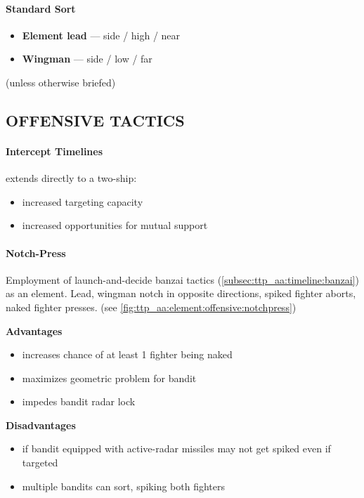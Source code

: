 \paragraph{Standard Sort}
\begin{itemize}
    \item \textbf{Element lead} --- side / high / near
    \item \textbf{Wingman} --- side / low / far
\end{itemize}
\hfill(unless otherwise briefed)

\clearpage

\subsection{OFFENSIVE TACTICS}

\paragraph{Intercept Timelines} 
 extends directly to a two-ship:
\begin{itemize}
    \item increased targeting capacity
    \item increased opportunities for mutual support
\end{itemize}

\paragraph{Notch-Press}
Employment of launch-and-decide banzai tactics (\cref{subsec:ttp_aa:timeline:banzai})
as an element. Lead, wingman notch in opposite directions, 
spiked fighter aborts, 
naked fighter presses.
\hfill(see \cref{fig:ttp_aa:element:offensive:notchpress})

\begin{multicols}{2}
    \textbf{Advantages}
    \begin{itemize}
        \item increases chance of at least 1 fighter being naked
        \item maximizes geometric problem for bandit
        \item impedes bandit radar lock
    \end{itemize}
    \columnbreak
    \textbf{Disadvantages}
    \begin{itemize}
        \item if bandit equipped with active-radar missiles may not get spiked even if targeted
        \item multiple bandits can sort, spiking both fighters
    \end{itemize}
\end{multicols}

